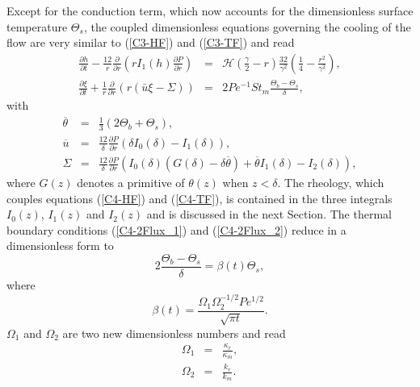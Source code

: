 Except  for   the  conduction  term,   which  now  accounts   for  the
dimensionless    surface   temperature    $\Theta_s$,   the    coupled
dimensionless equations  governing the  cooling of  the flow  are very
similar to (\ref{C3-HF}) and (\ref{C3-TF}) and read
\begin{eqnarray}
  \frac{\partial h}{\partial t}-\frac{12}{r}
  \frac{\partial}{\partial      r}
  \left( r I_1(h) \frac{\partial P}{\partial
  r}\right)
  \label{C4-HF}
  & =& \mathcal{H}(\frac{\gamma}{2}-r)\frac{32}{\gamma^{2}}\left(\frac{1}{4}-\frac{r^{2}}{\gamma^{2}}\right),\\
  \frac{\partial                                       \xi}{\partial
  t}+\frac{1}{r}\frac{\partial}{\partial                          r}
  \left( r\left(\bar{u}\xi-\Sigma\right)\right)&=&2Pe^{-1}St_m\frac{\Theta_b-\Theta_s}{\delta},\label{C4-TF}
\end{eqnarray}
with
\begin{eqnarray}
  \overline{\theta}&=&\frac{1}{3}\left(2\Theta_b+\Theta_s\right)\label{C4-tbar},\\
  \overline{u}&=&\frac{12}{\delta}
                  \frac{\partial
                  P}{\partial
                  r}\left(\delta
                  I_0(\delta)-I_1(\delta)\right),\\
  \Sigma &=& \frac{12}{\delta} \frac{\partial P}{\partial r}\left(I_0(\delta)\left(G(\delta)-\delta\overline{\theta}\right)+\overline{\theta}I_1(\delta)-I_2(\delta)\right),
\end{eqnarray}
where $G(z)$ denotes  a primitive of $\theta(z)$  when $z<\delta$. The
rheology, which couples equations  (\ref{C4-HF}) and (\ref{C4-TF}), is
contained in the  three integrals $I_0(z)$, $I_1(z)$  and $I_2(z)$ and
is discussed  in the  next Section.   The thermal  boundary conditions
(\ref{C4-2Flux_1})  and (\ref{C4-2Flux_2})  reduce in  a dimensionless
form to
\begin{equation}
  2\frac{\Theta_b-\Theta_s}{\delta} = \beta(t)\Theta_s,
  \label{C4-Boundary-Condi}
\end{equation}
where
\begin{equation}
  \beta(t) = \frac{\Omega_1\Omega_2^{-1/2} Pe^{1/2}}{\sqrt{\pi t}}.\label{C4_beta}
\end{equation}
$\Omega_1$ and $\Omega_2$ are two new dimensionless numbers and read
\begin{eqnarray}
  \Omega_1&=&\frac{\kappa_r}{\kappa_m},\label{C4-Omega1}\\
  \Omega_2&=&\frac{k_r}{k_m}.\label{C4-Omega2}
\end{eqnarray}
